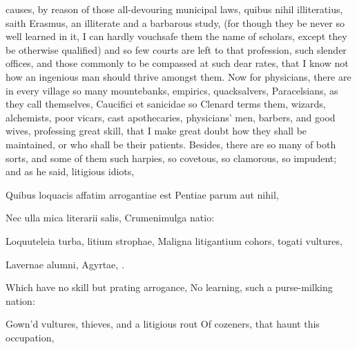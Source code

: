 {causes, by reason of those all-devouring municipal laws, quibus nihil
illiteratius, saith  Erasmus, an illiterate and a barbarous
study, (for though they be never so well learned in it, I can hardly
vouchsafe them the name of scholars, except they be otherwise
qualified) and so few courts are left to that profession, such slender
offices, and those commonly to be compassed at such dear rates, that I
know not how an ingenious man should thrive amongst them. Now for
physicians, there are in every village so many mountebanks, empirics,
quacksalvers, Paracelsians, as they call themselves, Caucifici et
sanicidae so Clenard terms them, wizards, alchemists, poor
vicars, cast apothecaries, physicians' men, barbers, and good wives,
professing great skill, that I make great doubt how they shall be
maintained, or who shall be their patients. Besides, there are so many
of both sorts, and some of them such harpies, so covetous, so
clamorous, so impudent; and as he said, litigious idiots,

Quibus loquacis affatim arrogantiae est
Pentiae parum aut nihil,

Nec ulla mica literarii salis,
Crumenimulga natio:

Loquuteleia turba, litium strophae,
Maligna litigantium cohors, togati vultures,

Lavernae alumni, Agyrtae, \etc{}.


Which have no skill but prating arrogance,
No learning, such a purse-milking nation:

Gown'd vultures, thieves, and a litigious rout
Of cozeners, that haunt this occupation,

}
